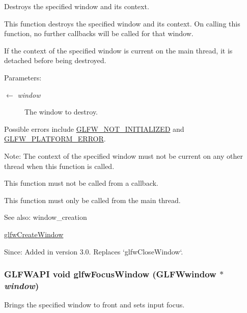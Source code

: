 Destroys the specified window and its context. 

This function destroys the specified window and its context. On calling this function, no further callbacks will be called for that window.

If the context of the specified window is current on the main thread, it is detached before being destroyed.

\begin{Desc}
\item[Parameters:]
\begin{description}
\item[\mbox{$\leftarrow$} {\em window}]The window to destroy.\end{description}
\end{Desc}
Possible errors include \hyperlink{group__errors_g2374ee02c177f12e1fa76ff3ed15e14a}{GLFW\_\-NOT\_\-INITIALIZED} and \hyperlink{group__errors_gd44162d78100ea5e87cdd38426b8c7a1}{GLFW\_\-PLATFORM\_\-ERROR}.

\begin{Desc}
\item[Note:]The context of the specified window must not be current on any other thread when this function is called.\end{Desc}
This function must not be called from a callback.

This function must only be called from the main thread.

\begin{Desc}
\item[See also:]window\_\-creation 

\hyperlink{group__window_g680a02abe0e4494b6759d5703240713e}{glfwCreateWindow}\end{Desc}
\begin{Desc}
\item[Since:]Added in version 3.0. Replaces `glfwCloseWindow`. \end{Desc}
\hypertarget{group__window_g0da0e3daaa2d100f44a115c09077b510}{
\subsubsection[glfwFocusWindow]{\setlength{\rightskip}{0pt plus 5cm}GLFWAPI void glfwFocusWindow ({\bf GLFWwindow} $\ast$ {\em window})}}
\label{group__window_g0da0e3daaa2d100f44a115c09077b510}


Brings the specified window to front and sets input focus. 

